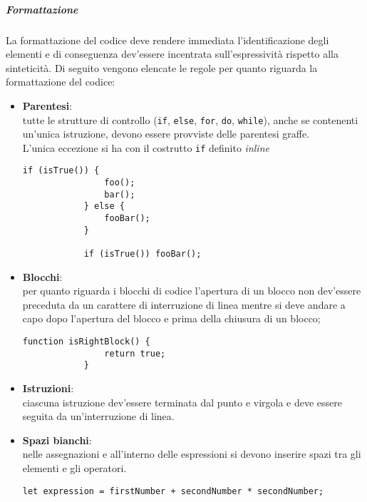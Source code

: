 \subparagraph{Formattazione}

La formattazione del codice deve rendere immediata l'identificazione degli elementi e di conseguenza dev'essere incentrata sull'espressività
rispetto alla sinteticità.
Di seguito vengono elencate le regole per quanto riguarda la formattazione del codice:
\begin{itemize}
	\item \textbf{Parentesi}:\\
		tutte le strutture di controllo (\texttt{if}, \texttt{else}, \texttt{for}, \texttt{do}, \texttt{while}), anche se contenenti
		un'unica istruzione, devono essere provviste delle parentesi graffe.\\

		L'unica eccezione si ha con il costrutto \texttt{if} definito \emph{inline}\\

		\begin{lstlisting}[style=htmlcssjs]
			if (isTrue()) {
				foo();
				bar();
			} else {
				fooBar();
			}

			if (isTrue()) fooBar();
		\end{lstlisting}

	\item \textbf{Blocchi}:\\
		per quanto riguarda i blocchi di codice l'apertura di un blocco non dev'essere preceduta da un carattere di interruzione di linea
		mentre si deve andare a capo dopo l'apertura del blocco e prima della chiusura di un blocco;
		\begin{lstlisting}[style=htmlcssjs]
			function isRightBlock() {
				return true;
			}
		\end{lstlisting}

	\item \textbf{Istruzioni}:\\
		ciascuna istruzione dev'essere terminata dal punto e virgola e deve essere seguita da un'interruzione di linea.

	\item \textbf{Spazi bianchi}:\\
		nelle assegnazioni e all'interno delle espressioni si devono inserire spazi tra gli elementi e gli operatori.
		\begin{lstlisting}[style=htmlcssjs]
			let expression = firstNumber + secondNumber * secondNumber;
		\end{lstlisting}
\end{itemize}

